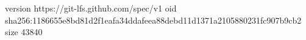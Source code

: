 version https://git-lfs.github.com/spec/v1
oid sha256:1186655e8bd81d2f1eafa34ddafeea88debd11d1371a2105880231fc907b9cb2
size 43840
